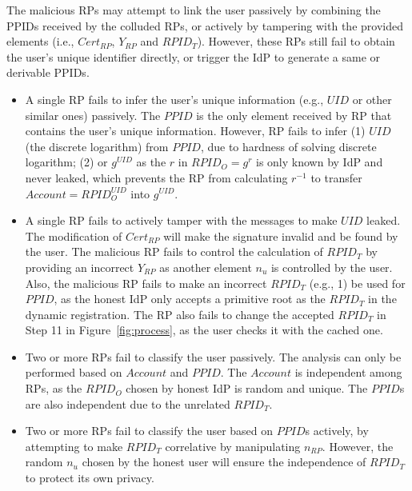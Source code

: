  The malicious RPs may attempt to link the user passively by combining the PPIDs received by the colluded RPs, or actively by tampering with the provided elements (i.e., $Cert_{RP}$, $Y_{RP}$ and $RPID_T$). However, these RPs still fail to obtain the user's unique identifier directly, or trigger the IdP to generate a same or derivable PPIDs.
\begin{itemize}
\item A single RP fails to infer the user's unique information (e.g., $UID$ or other similar ones) passively. The $PPID$ is the only element received by RP that contains the user's unique information. However, RP fails to infer (1) $UID$ (the discrete logarithm) from $PPID$, due to hardness of solving discrete logarithm; (2) or $g^{UID}$ as the $r$ in $RPID_O=g^r$ is only known by IdP and never leaked, which prevents the RP from calculating $r^{-1}$ to transfer $Account=RPID_O^{UID}$ into  $g^{UID}$.
\item A single RP fails to actively tamper with the messages to make $UID$ leaked. The modification of  $Cert_{RP}$ will make the signature invalid and be found by the user. The malicious RP fails to control the calculation of $RPID_T$ by providing an incorrect $Y_{RP}$ as another element $n_u$ is  controlled by the user. Also, the malicious RP fails to make an incorrect $RPID_T$ (e.g., 1)  be used for $PPID$, as the honest IdP only accepts a primitive root as the $RPID_T$ in the dynamic registration. The RP also fails to change the accepted $RPID_T$ in Step 11 in Figure~\ref{fig:process}, as the user checks it with the cached one.
\item Two or more RPs fail to classify the user passively. The analysis can only be performed based on $Account$ and $PPID$. The $Account$ is independent among RPs, as the $RPID_O$ chosen by honest IdP is random and unique. The $PPID$s are  also independent due to the unrelated $RPID_T$.
\item Two or more RPs fail to classify the user based on $PPID$s actively, by attempting to make $RPID_T$ correlative by manipulating $n_{RP}$. However, the random $n_u$ chosen by the honest user will ensure the independence of $RPID_T$ to protect its own privacy.

\end{itemize}


